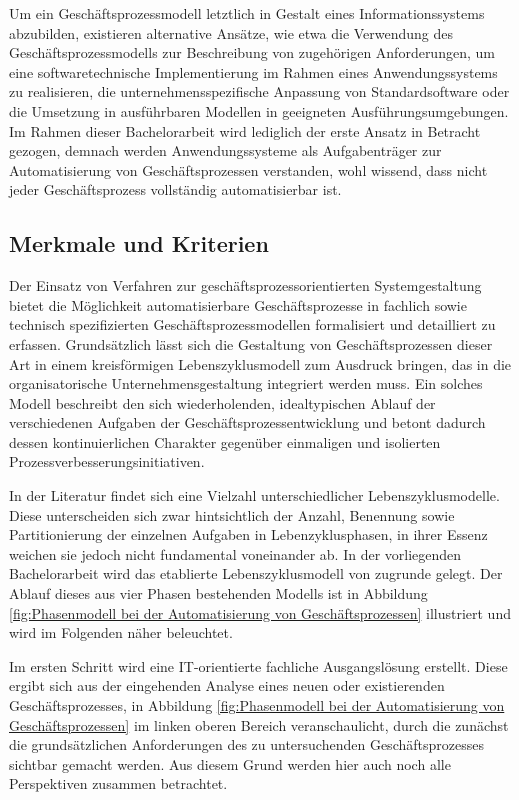 Um ein Geschäftsprozessmodell letztlich in Gestalt eines Informationssystems abzubilden, existieren alternative Ansätze, wie etwa die Verwendung des Geschäftsprozessmodells zur Beschreibung von zugehörigen Anforderungen, um eine softwaretechnische Implementierung im Rahmen eines Anwendungssystems zu realisieren, die unternehmensspezifische Anpassung von Standardsoftware oder die Umsetzung in ausführbaren Modellen in geeigneten Ausführungsumgebungen.
\cite{Lehmann.2008} 
Im Rahmen dieser Bachelorarbeit wird lediglich der erste Ansatz in Betracht gezogen, demnach werden Anwendungssysteme als Aufgabenträger zur Automatisierung von Geschäftsprozessen verstanden, wohl wissend, dass nicht jeder Geschäftsprozess vollständig automatisierbar ist.

\subsection{Merkmale und Kriterien}
Der Einsatz von Verfahren zur geschäftsprozessorientierten Systemgestaltung bietet die Möglichkeit automatisierbare Geschäftsprozesse in fachlich sowie technisch spezifizierten Geschäftsprozessmodellen formalisiert und detailliert zu erfassen.
Grundsätzlich lässt sich die Gestaltung von Geschäftsprozessen dieser Art in einem kreisförmigen Lebenszyklusmodell zum Ausdruck bringen, das in die organisatorische Unternehmensgestaltung integriert werden muss. 
\cite{Scheer.1991}
Ein solches Modell beschreibt den sich wiederholenden, idealtypischen Ablauf der verschiedenen Aufgaben der Geschäftsprozessentwicklung und betont dadurch dessen kontinuierlichen Charakter gegenüber einmaligen und isolierten Prozessverbesserungsinitiativen.
\cite{Leiting.2012}

In der Literatur findet sich eine Vielzahl unterschiedlicher Lebenszyklusmodelle.
\cite{MacedodeMorais.2014} 
Diese unterscheiden sich zwar hintsichtlich der Anzahl, Benennung sowie Partitionierung der einzelnen Aufgaben in Lebenzyklusphasen, in ihrer Essenz weichen sie jedoch nicht fundamental voneinander ab.
\cite{Houy.2010}
In der vorliegenden Bachelorarbeit wird das etablierte Lebenszyklusmodell von \citeauthor{Scheer.1991}
\cite{Scheer.1991} zugrunde gelegt.
Der Ablauf dieses aus vier Phasen bestehenden Modells ist in Abbildung \ref{fig:Phasenmodell bei der Automatisierung von Geschäftsprozessen} illustriert und wird im Folgenden näher beleuchtet.

Im ersten Schritt wird eine \ac{IT}-orientierte fachliche Ausgangslösung erstellt.
Diese ergibt sich aus der eingehenden Analyse eines neuen oder existierenden Geschäftsprozesses, in Abbildung \ref{fig:Phasenmodell bei der Automatisierung von Geschäftsprozessen} im linken oberen Bereich veranschaulicht, durch die zunächst die grundsätzlichen Anforderungen des zu untersuchenden Geschäftsprozesses sichtbar gemacht werden.
\cite{Schwegmann.2002}
Aus diesem Grund werden hier auch noch alle Perspektiven zusammen betrachtet.

